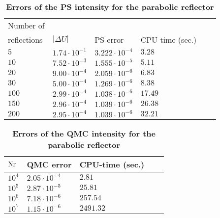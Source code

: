 \begin{table}[t] 
\centering
\caption{\bf Errors of the PS intensity for the parabolic reflector}
\begin{tabular}{llllll}
 \hline  Number of\\
 reflections\;  & $|\Delta U|$ & PS error  & CPU-time (sec.)\\
  \hline 
 $5$      & $1.74\cdot 10^{-1}$  & $3.222\cdot10^{-4}$& $3.28$  \\
$10$      & $7.52\cdot 10^{-3}$ & $1.555\cdot 10^{-5}$& $5.11$   \\
$20$      & $9.00 \cdot 10^{-4}$ & $2.059\cdot 10^{-6}$& $6.83$  \\
 $30$    & $5.00 \cdot 10^{-4}$ & $1.269\cdot 10^{-6}$ & $8.38$  \\
$100$    & $2.99 \cdot 10^{-4}$ & $1.038\cdot 10^{-6}$ & $17.49$  \\
$150$    & $2.96 \cdot 10^{-4}$ & $1.039\cdot 10^{-6}$ & $26.38$  \\
$200$    & $2.95 \cdot 10^{-4}$ & $1.039\cdot 10^{-6}$ & $32.21$  \\
 \hline
 \end{tabular}
 \label{tab:ray_mapping_pr}
 \end{table}
\begin{table}[t] 
\centering
\caption{\bf Errors of the QMC intensity for the parabolic reflector}
\begin{tabular}{lllll}
 \hline  $\textrm{Nr}$\;  & QMC error & CPU-time (sec.)\\
  \hline 
$10^4$     & $2.05\cdot 10^{-4}$   & $2.81$  \\
$10^5$     & $2.87\cdot 10^{-5}$   & $25.81$   \\
$10^6$     & $7.18 \cdot 10^{-6}$  & $257.54$  \\
$10^7$     & $1.15 \cdot 10^{-6}$  & $2491.32$  \\
 \hline
 \end{tabular}
 \label{tab:qmc_raymapping_pr}
 \end{table}
